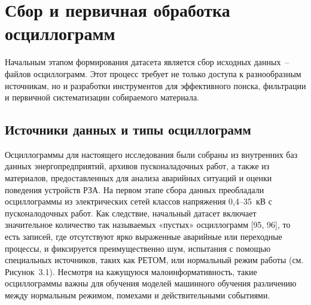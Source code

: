 
\section{Сбор и первичная обработка осциллограмм}\label{sec:ch3_data_collection}

Начальным этапом формирования датасета является сбор исходных данных~-- файлов осциллограмм. Этот процесс требует не только доступа к разнообразным источникам, но и разработки инструментов для эффективного поиска, фильтрации и первичной систематизации собираемого материала.\par\vspace{0.2cm}

\subsection{Источники данных и типы осциллограмм}\label{sec:ch3_data_sources}

Осциллограммы для настоящего исследования были собраны из внутренних баз данных энергопредприятий, архивов пусконаладочных работ, а также из материалов, предоставленных для анализа аварийных ситуаций и оценки поведения устройств РЗА. На первом этапе сбора данных преобладали осциллограммы из электрических сетей классов напряжения 0,4--35~кВ с пусконалодочных работ. Как следствие, начальный датасет включает значительное количество так называемых «пустых» осциллограмм [95, 96], то есть записей, где отсутствуют ярко выраженные аварийные или переходные процессы, и фиксируется преимущественно шум, испытания с помощью специальных источников, таких как РЕТОМ, или нормальный режим работы (см. Рисунок~3.1). Несмотря на кажущуюся малоинформативность, такие осциллограммы важны для обучения моделей машинного обучения различению между нормальным режимом, помехами и действительными событиями.\par\vspace{0.2cm}


